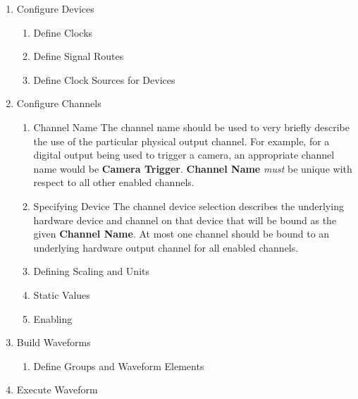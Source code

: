 \begin{enumerate}
  \item Configure Devices

    \begin{enumerate}
      \item Define Clocks

      \item Define Signal Routes

      \item Define Clock Sources for Devices

    \end{enumerate}
  \item Configure Channels
    \begin{enumerate}
      \item Channel Name
        The channel name should be used to very briefly describe the use of the
        particular physical output channel.  For example, for a digital output
        being used to trigger a camera, an appropriate channel name would be
        \textbf{Camera Trigger}.  \textbf{Channel Name} \textit{must} be unique with respect
        to all other enabled channels.
      \item Specifying Device
        The channel device selection describes the underlying hardware device
        and channel on that device that will be bound as the given
        \textbf{Channel Name}.  At most one channel should be bound to an
        underlying hardware output channel for all enabled channels.

      \item Defining Scaling and Units

      \item Static Values
      \item Enabling
    \end{enumerate}
  \item Build Waveforms
    \begin{enumerate}
      \item Define Groups and Waveform Elements
    \end{enumerate}
  \item Execute Waveform
\end{enumerate}
